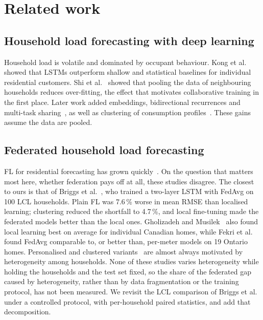 \section{Related work}\label{sec:related}

\subsection{Household load forecasting with deep learning}
Household load is volatile and dominated by occupant behaviour. Kong et al.~\cite{kong2019stlf} showed that LSTMs
outperform shallow and statistical baselines for individual residential customers. Shi et al.~\cite{shi2018pdrnn}
showed that pooling the data of neighbouring households reduces over-fitting, the effect that motivates
collaborative training in the first place. Later work added embeddings, bidirectional recurrences and multi-task
sharing~\cite{aurangzeb2024,xiao2023}, as well as clustering of consumption profiles~\cite{dab2023}. These gains assume
the data are pooled.

\subsection{Federated household load forecasting}
FL for residential forecasting has grown quickly~\cite{fernndez2022,fekri2022,gholizadeh2022,yang2023,liu2023,fekri2023,
qu2023,wang2023,khalil2023,widmer2023,dogra2023,sarmento2024,abdulla2024,singh2024,manzoor2024,mao2024,huang2024,
mostafanezhad2025,kaur2025,shao2026,das2026,wang2026,tibermacine2026,he2026,lu2024fds,husnoo2024,he2023hfl,
duttagupta2023,rahman2025multihop}.
On the question that matters most here, whether federation pays off at all, these studies disagree. The closest
to ours is that of Briggs et al.~\cite{briggs2022}, who trained a two-layer LSTM with FedAvg on 100 LCL households.
Plain FL was 7.6\,\% worse in mean RMSE than localised learning; clustering reduced the shortfall to 4.7\,\%, and
local fine-tuning made the federated models better than the local ones. Gholizadeh and Musilek~\cite{gholizadeh2022}
also found local learning best on average for individual Canadian homes, while Fekri et al.~\cite{fekri2022} found
FedAvg comparable to, or better than, per-meter models on 19 Ontario homes. Personalised and clustered
variants~\cite{qu2023,widmer2023,dogra2023,das2026,wang2026,lu2024fds} are almost always motivated by heterogeneity
among households.
None of these studies varies heterogeneity while holding the households and the test set fixed, so the share of the
federated gap caused by heterogeneity, rather than by data fragmentation or the training protocol, has not been
measured. We revisit the LCL comparison of Briggs et al. under a controlled protocol, with per-household paired
statistics, and add that decomposition.

